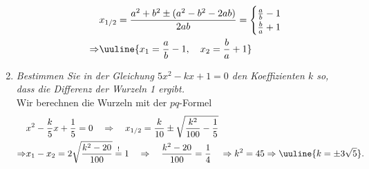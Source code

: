 \begin{enumerate}[label=(\alph*)]
\begin{enumerate}[label=\arabic*)]
\begin{align}
            &x_{1/2} = \frac{a^2 + b^2 \pm (a^2-b^2 -2ab)}{2ab} = \begin{cases}
                \frac{a}{b}-1 \\ \frac{b}{a}+1
            \end{cases}\\
            \Rightarrow &\uuline{x_1 = \frac{a}{b}-1, \quad x_2 = \frac{b}{a}+1}
        \end{align}
    \end{enumerate}
    \item \emph{Bestimmen Sie in der Gleichung $5x^2-kx+1=0$ den Koeffizienten $k$ so, dass die Differenz der Wurzeln 1 ergibt.}\\
    Wir berechnen die Wurzeln mit der $pq$-Formel 
    \begin{align}
        &x^2 - \frac{k}{5}x +\frac{1}{5} = 0 \quad \Rightarrow \quad x_{1/2} = \frac{k}{10} \pm \sqrt{\frac{k^2}{100}-\frac{1}{5}} \\
        \Rightarrow &x_1 - x_2 = 2 \sqrt{\frac{k^2-20}{100}} \overset{!}{=}1 \quad \Rightarrow \quad \frac{k^2 - 20}{100}=\frac{1}{4} \quad \Rightarrow k^2 = 45 \Rightarrow \uuline{k = \pm 3 \sqrt{5}}.
    \end{align}
    

\end{enumerate}
